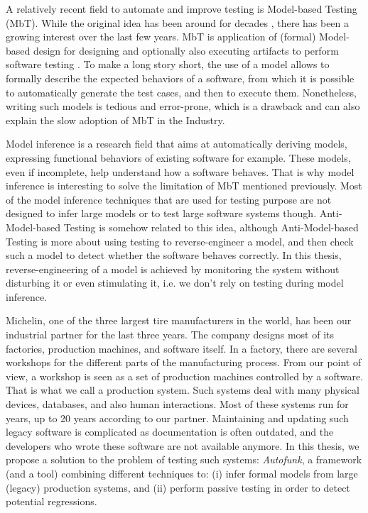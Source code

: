 A relatively recent field to automate and improve testing is
Model-based Testing (MbT). While the original idea has been
around for decades \cite{moore56}, there has been a growing
interest over the last few years.  MbT is application of (formal)
Model-based design for designing and optionally also executing
artifacts to perform software testing
\cite{Jorgensen:1995:STC:526521}. To make a long story short, the
use of a model allows to formally describe the expected behaviors
of a software, from which it is possible to automatically
generate the test cases, and then to execute them.  Nonetheless,
writing such models is tedious and error-prone, which is a
drawback and can also explain the slow adoption of MbT in the
Industry.

Model inference is a research field that aims at automatically
deriving models, expressing functional behaviors of existing
software for example. These models, even if incomplete, help
understand how a software behaves. That is why model inference is
interesting to solve the limitation of MbT mentioned previously.
Most of the model inference techniques that are used for testing
purpose are not designed to infer large models or to test large
software systems though. Anti-Model-based Testing \cite{antimbt} is
somehow related to this idea, although Anti-Model-based Testing
is more about using testing to reverse-engineer a model, and then
check such a model to detect whether the software behaves
correctly. In this thesis, reverse-engineering of a model is
achieved by monitoring the system without disturbing it or even
stimulating it, i.e. we don't rely on testing during model
inference.

Michelin, one of the three largest tire manufacturers in the
world, has been our industrial partner for the last three years.
The company designs most of its factories, production machines,
and software itself. In a factory, there are several workshops
for the different parts of the manufacturing process. From our
point of view, a workshop is seen as a set of production machines
controlled by a software. That is what we call a production
system. Such systems deal with many physical devices, databases,
and also human interactions. Most of these systems run for years,
up to 20 years according to our partner. Maintaining and updating
such legacy software is complicated as documentation is often
outdated, and the developers who wrote these software are not
available anymore.  In this thesis, we propose a solution to the
problem of testing such systems: \textit{Autofunk}, a framework
(and a tool) combining different techniques to: (i) infer formal
models from large (legacy) production systems, and (ii) perform
passive testing in order to detect potential regressions.


